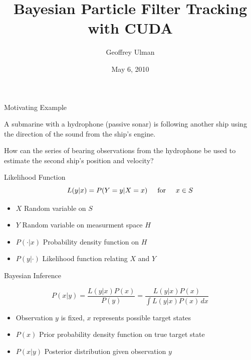\documentclass{beamer}
\title{Bayesian Particle Filter Tracking with CUDA}
\author{Geoffrey Ulman}
\date{May 6, 2010}
\begin{document}

\begin{frame}
\titlepage
\end{frame}


\begin{frame}{Motivating Example}

A submarine with a hydrophone (passive sonar) is following another
ship using the direction of the sound from the ship's engine.

\vspace{1cm}

How can the series of bearing observations from the hydrophone be
used to estimate the second ship's position and velocity?

\end{frame}


\begin{frame}{Likelihood Function}
\begin{equation}
L(y|x) = P( Y=y | X=x ) \hspace{0.5cm} \mbox{for} \hspace{0.5cm} x \in S
\end{equation}

\vspace{1cm}

\begin{itemize}
\item \(X\) Random variable on \(S\)
\item \(Y\) Random variable on measurment space \(H\)
\item \(P(\cdot|x)\) Probability density function on \(H\)
\item \(P(y|\cdot)\) Likelihood function relating \(X\) and \(Y\)
\end{itemize}

\end{frame}


\begin{frame}{Bayesian Inference}

\begin{equation}
P(x|y) = \frac{L(y|x)P(x)}{P(y)} = \frac{L(y|x)P(x)}{\int \! L(y|x)P(x) \, dx}
\end{equation}

\vspace{1cm}

\begin{itemize}
\item Observation \(y\) is fixed, \(x\) represents possible target states
\item \(P(x)\) Prior probability density function on true target state
\item \(P(x|y)\) Posterior distribution given observation \(y\)
\end{itemize}

\end{frame}
\end{document}
